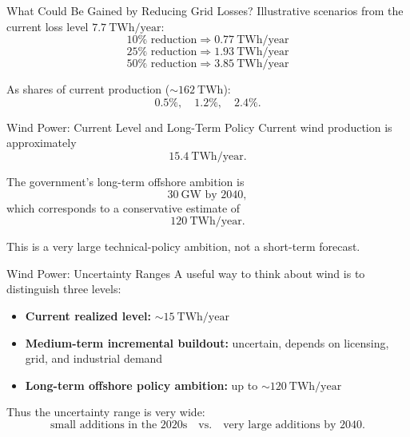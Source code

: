 \documentclass[aspectratio=169]{beamer}
\begin{document}
\begin{frame}{What Could Be Gained by Reducing Grid Losses?}
Illustrative scenarios from the current loss level \(7.7\ \text{TWh/year}\):
\[
10\% \text{ reduction} \Rightarrow 0.77\ \text{TWh/year}
\]
\[
25\% \text{ reduction} \Rightarrow 1.93\ \text{TWh/year}
\]
\[
50\% \text{ reduction} \Rightarrow 3.85\ \text{TWh/year}
\]

\medskip

As shares of current production (\(\sim 162\ \text{TWh}\)):
\[
0.5\%,\quad 1.2\%,\quad 2.4\%.
\]
\end{frame}

\begin{frame}{Wind Power: Current Level and Long-Term Policy}
Current wind production is approximately
\[
15.4\ \text{TWh/year}.
\]

\medskip

The government's long-term offshore ambition is
\[
30\ \text{GW by 2040},
\]
which corresponds to a conservative estimate of
\[
120\ \text{TWh/year}.
\]

\medskip

This is a very large technical-policy ambition, not a short-term forecast.
\end{frame}

\begin{frame}{Wind Power: Uncertainty Ranges}
A useful way to think about wind is to distinguish three levels:

\begin{itemize}
    \item \textbf{Current realized level:} \(\sim 15\ \text{TWh/year}\)
    \item \textbf{Medium-term incremental buildout:} uncertain, depends on licensing, grid, and industrial demand
    \item \textbf{Long-term offshore policy ambition:} up to \(\sim 120\ \text{TWh/year}\)
\end{itemize}

\medskip

Thus the uncertainty range is very wide:
\[
\text{small additions in the 2020s} \quad \text{vs.} \quad \text{very large additions by 2040.}
\]
\end{frame}
\end{document}
